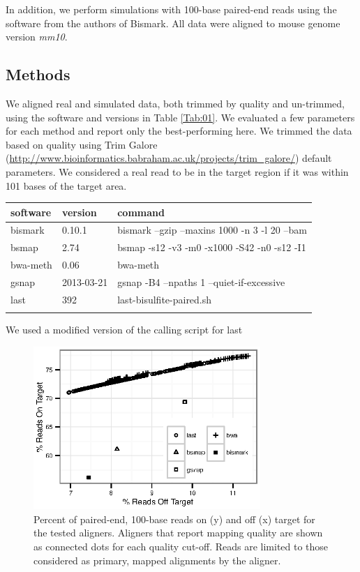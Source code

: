 \documentclass{bioinfo}
\begin{document}
In addition, we perform simulations with 100-base paired-end reads using
the software from the authors of Bismark. All data were aligned to mouse
genome version \textit{mm10}.


\begin{methods}
\section{Methods}
We aligned real and simulated data, both trimmed by quality and
un-trimmed, using the software and versions in Table \ref{Tab:01}.
We evaluated a few parameters for each method and report only the
best-performing here. We trimmed the data based on quality
using Trim Galore (\href{http://www.bioinformatics.babraham.ac.uk/projects/trim\_galore/}{http://www.bioinformatics.babraham.ac.uk/projects/trim\_galore/})
default parameters.
We considered a real read to be in the target region if it
was within 101 bases of the target area. 

\begin{table}[!t]
{\begin{tabular}{lll}\toprule
software & version & command\\\midrule
bismark & 0.10.1 & bismark --gzip --maxins 1000 -n 3 -l 20 --bam\\
bsmap & 2.74 & bsmap -s12 -v3 -m0 -x1000 -S42 -n0 -s12 -I1\\
bwa-meth & 0.06 & bwa-meth\\
gsnap & 2013-03-21 & gsnap -B4 --npaths 1 --quiet-if-excessive\\
last & 392 & last-bisulfite-paired.sh\\\botrule
\end{tabular}}{We used a modified version of the calling script for last}
\end{table}

\end{methods}

\begin{figure}[!tpb]%
    \centerline{\includegraphics[width=86mm]{qual-plot-real}}
    \caption{Percent of paired-end, 100-base reads on (y) and off (x) target for the tested aligners. Aligners that report mapping quality are shown as connected dots for each quality cut-off. Reads are limited to those considered as primary, mapped alignments by the aligner.}\label{fig:01}
\end{figure}
\end{document}
